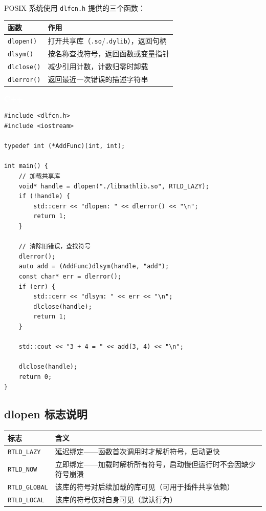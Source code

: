 \documentclass[12pt,a4paper,fontset=fandol]{ctexbook}
\newcommand{\cpplabel}{%
  \begin{tcolorbox}[enhanced,colback=cppheadbg,colframe=cppheadbg,
    arc=1mm,boxrule=0mm,left=6pt,right=6pt,top=2pt,bottom=2pt,
    halign=left,oversize]
    \textcolor{white}{\small\bfseries C++}
  \end{tcolorbox}\vspace{-4pt}}
\newcommand{\Fn}[1]{\texttt{#1()}}
\begin{document}
POSIX 系统使用 \texttt{dlfcn.h} 提供的三个函数：

\begin{longtable}{lp{8cm}}
\toprule
\textbf{函数} & \textbf{作用} \\
\midrule
\Fn{dlopen}  & 打开共享库（\texttt{.so}/\allowbreak{}\texttt{.dylib}），返回句柄 \\
\Fn{dlsym}   & 按名称查找符号，返回函数或变量指针 \\
\Fn{dlclose} & 减少引用计数，计数归零时卸载 \\
\Fn{dlerror} & 返回最近一次错误的描述字符串 \\
\bottomrule
\end{longtable}

\cpplabel
\begin{lstlisting}[style=cppstyle]
#include <dlfcn.h>
#include <iostream>

typedef int (*AddFunc)(int, int);

int main() {
    // 加载共享库
    void* handle = dlopen("./libmathlib.so", RTLD_LAZY);
    if (!handle) {
        std::cerr << "dlopen: " << dlerror() << "\n";
        return 1;
    }

    // 清除旧错误，查找符号
    dlerror();
    auto add = (AddFunc)dlsym(handle, "add");
    const char* err = dlerror();
    if (err) {
        std::cerr << "dlsym: " << err << "\n";
        dlclose(handle);
        return 1;
    }

    std::cout << "3 + 4 = " << add(3, 4) << "\n";

    dlclose(handle);
    return 0;
}
\end{lstlisting}

\subsection{dlopen 标志说明}

\begin{longtable}{lp{7cm}}
\toprule
\textbf{标志} & \textbf{含义} \\
\midrule
\texttt{RTLD\_LAZY}   & 延迟绑定——函数首次调用时才解析符号，启动更快 \\
\texttt{RTLD\_NOW}    & 立即绑定——加载时解析所有符号，启动慢但运行时不会因缺少符号崩溃 \\
\texttt{RTLD\_GLOBAL} & 该库的符号对后续加载的库可见（可用于插件共享依赖） \\
\texttt{RTLD\_LOCAL}  & 该库的符号仅对自身可见（默认行为） \\
\bottomrule
\end{longtable}
\end{document}

